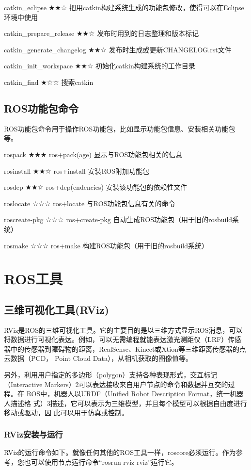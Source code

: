 \documentclass[geye,green,kindle,cn]{elegantnote}
\begin{document}
catkin\_eclipse ★★☆ 把用catkin构建系统生成的功能包修改，使得可以在Eclipse环境中使用 

catkin\_prepare\_release ★★☆ 发布时用到的日志整理和版本标记

catkin\_generate\_changelog ★★☆ 发布时生成或更新CHANGELOG.rst文件 

catkin\_init\_workspace ★★☆ 初始化catkin构建系统的工作目录 

catkin\_find ★☆☆ 搜索catkin 
\subsection{ROS功能包命令}
ROS功能包命令用于操作ROS功能包，比如显示功能包信息、安装相关功能包等。

rospack ★★★ ros+pack(age) 显示与ROS功能包相关的信息

rosinstall ★★☆ ros+install 安装ROS附加功能包 

rosdep ★★☆ ros+dep(endencies) 安装该功能包的依赖性文件 

roslocate ☆☆☆ ros+locate 与ROS功能包信息有关的命令 

roscreate-pkg ☆☆☆ ros+create-pkg 自动生成ROS功能包（用于旧的rosbuild系统） 

rosmake ☆☆☆ ros+make 构建ROS功能包（用于旧的rosbuild系统） 
\section{ROS工具}
\subsection{三维可视化工具(RViz)}
RViz是ROS的三维可视化工具。它的主要目的是以三维方式显示ROS消息，可以将数据进行可视化表达。例如，可以无需编程就能表达激光测距仪（LRF）传感器中的传感器到障碍物的距离，RealSense、Kinect或Xtion等三维距离传感器的点云数据（PCD， Point Cloud Data），从相机获取的图像值等。

另外，利用用户指定的多边形（polygon）支持各种表现形式，交互标记 （Interactive Markers）2可以表达接收来自用户节点的命令和数据并互交的过程。在 ROS中，机器人以URDF（Unified Robot Description Format，统一机器人描述格 式）3描述，它可以表示为三维模型，并且每个模型可以根据自由度进行移动或驱动，因 此可以用于仿真或控制。
\subsubsection{RViz安装与运行}
RViz的运行命令如下。就像任何其他的ROS工具一样，roscore必须运行。作为参考，您也可以使用节点运行命令“rosrun rviz rviz”运行它。 
\end{document}
